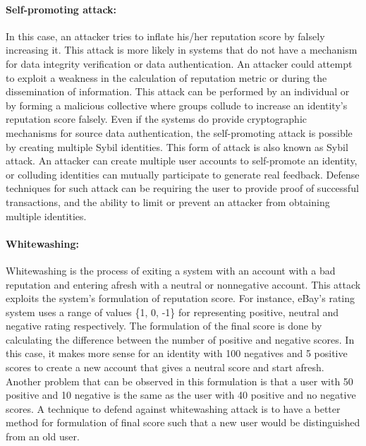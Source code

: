 \paragraph{Self-promoting attack:} In this case, an attacker tries to inflate
his/her reputation score by falsely increasing it. This attack is more likely
in systems that do not have a mechanism for data integrity verification or data
authentication. An attacker could attempt to exploit a weakness in the
calculation of reputation metric or during the dissemination of information.
This attack can be performed by an individual or by forming a malicious
collective where groups collude to increase an identity's reputation score
falsely. Even if the systems do provide cryptographic mechanisms for source
data authentication, the self-promoting attack is possible by creating multiple
Sybil identities. This form of attack is also known as Sybil attack. An
attacker can create multiple user accounts to self-promote an identity, or
colluding identities can mutually participate to generate real feedback.
Defense techniques for such attack can be requiring the user to provide proof
of successful transactions, and the ability to limit or prevent an attacker
from obtaining multiple identities. 
\paragraph{Whitewashing:} Whitewashing is the process of exiting a system with
an account with a bad reputation and entering afresh with a neutral or
nonnegative account. This attack exploits the system's formulation of
reputation score. For instance, eBay's rating system uses a range of values
\{1, 0, -1\} for representing positive, neutral and negative rating
respectively. The formulation of the final score is done by calculating the
difference between the number of positive and negative scores. In this case, it
makes more sense for an identity with 100 negatives and 5 positive scores to
create a new account that gives a neutral score and start afresh. Another
problem that can be observed in this formulation is that a user with 50
positive and 10 negative is the same as the user with 40 positive and no
negative scores. A technique to defend against whitewashing attack is to have a
better method for formulation of final score such that a new user would be
distinguished from an old user. 
